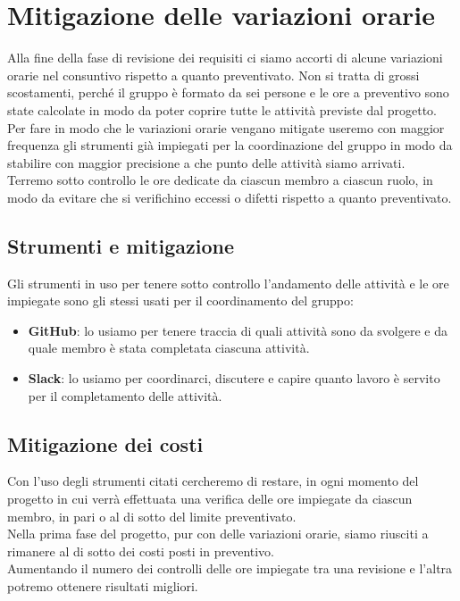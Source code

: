 \newpage

\section{Mitigazione delle variazioni orarie}	\label{C}
Alla fine della fase di revisione dei requisiti ci siamo accorti di alcune variazioni orarie nel consuntivo rispetto a quanto preventivato.
Non si tratta di grossi scostamenti, perché il gruppo è formato da sei persone e le ore a preventivo sono state calcolate in modo da poter coprire tutte le attività previste dal progetto.\\
Per fare in modo che le variazioni orarie vengano mitigate useremo con maggior frequenza gli strumenti già impiegati per la coordinazione del gruppo in modo da stabilire con maggior precisione a che punto delle attività siamo arrivati.\\
Terremo sotto controllo le ore dedicate da ciascun membro a ciascun ruolo, in modo da evitare che si verifichino eccessi o difetti rispetto a quanto preventivato.

    \subsection{Strumenti e mitigazione}
	Gli strumenti in uso per tenere sotto controllo l'andamento delle attività e le ore impiegate sono gli stessi usati per il coordinamento del gruppo:
	\begin{itemize}
	    \item \textbf{GitHub}: lo usiamo per tenere traccia di quali attività sono da svolgere e da quale membro è stata completata ciascuna attività.
	    \item \textbf{Slack}: lo usiamo per coordinarci, discutere e capire quanto lavoro è servito per il completamento delle attività.
	\end{itemize}
	
	\subsection{Mitigazione dei costi}
	Con l'uso degli strumenti citati cercheremo di restare, in ogni momento del progetto in cui verrà effettuata una verifica delle ore impiegate da ciascun membro, in pari o al di sotto del limite preventivato.\\
	Nella prima fase del progetto, pur con delle variazioni orarie, siamo riusciti a rimanere al di sotto dei costi posti in preventivo.\\
	Aumentando il numero dei controlli delle ore impiegate tra una revisione e l'altra potremo ottenere risultati migliori.


